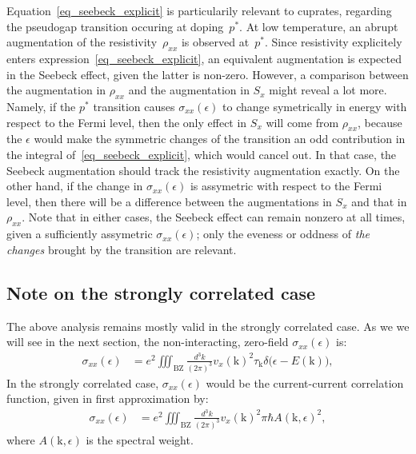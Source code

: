 \documentclass[notitlepage,11pt,nofootinbib]{revtex4-1}
\renewcommand{\vec}[1]{\bm{\mathrm{#1}}}
\begin{document}
Equation~\ref{eq_seebeck_explicit} is particularily relevant to cuprates, regarding the pseudogap transition occuring at doping~$p^*$. At low temperature, an abrupt augmentation of the resistivity~$\rho_{xx}$ is observed at~$p^*$. Since resistivity explicitely enters expression~\eqref{eq_seebeck_explicit}, an equivalent augmentation is expected in the Seebeck effect, given the latter is non-zero. However, a comparison between the augmentation in $\rho_{xx}$ and the augmentation in $S_x$ might reveal a lot more. Namely, if the $p^*$ transition causes $\sigma_{xx}(\epsilon)$ to change symetrically in energy with respect to the Fermi level, then the only effect in $S_x$ will come from $\rho_{xx}$, because the $\epsilon$ would make the symmetric changes of the transition an odd contribution in the integral of~\eqref{eq_seebeck_explicit}, which would cancel out. In that case, the Seebeck augmentation should track the resistivity augmentation exactly. On the other hand, if the change in $\sigma_{xx}(\epsilon)$ is assymetric with respect to the Fermi level, then there will be a difference between the augmentations in $S_x$ and that in $\rho_{xx}$. Note that in either cases, the Seebeck effect can remain nonzero at all times, given a sufficiently assymetric $\sigma_{xx}(\epsilon)$; only the eveness or oddness of \emph{the changes} brought by the transition are relevant.

\subsection{Note on the strongly correlated case}

The above analysis remains mostly valid in the strongly correlated case. As we we will see in the next section, the non-interacting, zero-field $\sigma_{xx}(\epsilon)$ is:
\begin{align}
\sigma_{xx}(\epsilon)
&=
e^2\iiint_{\text{BZ}}\frac{d^3k}{(2\pi)^3}
v_{x}(\vec k)^2
\tau_{\vec k}\delta\big(\epsilon-E(\vec k)\big),
\label{eq_will_return}
\end{align}
In the strongly correlated case, $\sigma_{xx}(\epsilon)$ would be the current-current correlation function, given in first approximation by:
\begin{align}
\sigma_{xx}(\epsilon) 
&=
e^2\iiint_{\text{BZ}}\frac{d^3k}{(2\pi)^3}
v_{x}(\vec k)^2
\pi\hbar A(\vec k,\epsilon)^2,
\end{align}
where $A(\vec k,\epsilon)$ is the spectral weight.
\end{document}
